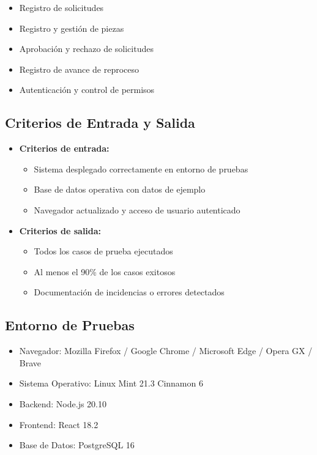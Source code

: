 \documentclass[12pt,letterpaper,spanish]{report}
\begin{document}
\begin{itemize}
    \item Registro de solicitudes
    \item Registro y gesti\'on de piezas
    \item Aprobaci\'on y rechazo de solicitudes
    \item Registro de avance de reproceso
    \item Autenticaci\'on y control de permisos
\end{itemize}


\subsection{Criterios de Entrada y Salida}
\begin{itemize}
    \item \textbf{Criterios de entrada:}
    \begin{itemize}
        \item Sistema desplegado correctamente en entorno de pruebas
        \item Base de datos operativa con datos de ejemplo
        \item Navegador actualizado y acceso de usuario autenticado
    \end{itemize}

    \item \textbf{Criterios de salida:}
    \begin{itemize}
        \item Todos los casos de prueba ejecutados
        \item Al menos el 90\% de los casos exitosos
        \item Documentaci\'on de incidencias o errores detectados
    \end{itemize}
\end{itemize}

\subsection{Entorno de Pruebas}
\begin{itemize}
    \item Navegador: Mozilla Firefox / Google Chrome / Microsoft Edge / Opera GX / Brave
    \item Sistema Operativo: Linux Mint 21.3 Cinnamon 6
    \item Backend: Node.js 20.10 
    \item Frontend: React 18.2  
    \item Base de Datos: PostgreSQL 16
\end{itemize}
\end{document}
